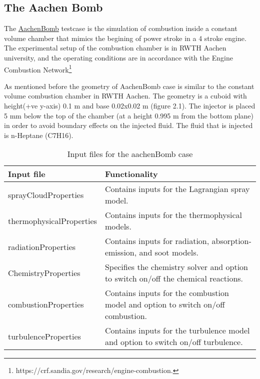 
\subsection{The Aachen Bomb}

The \href{https://develop.openfoam.com/Development/openfoam/-/tree/OpenFOAM-v2106/tutorials/lagrangian/sprayFoam/aachenBomb}{AachenBomb} testcase is the simulation of combustion inside a constant volume chamber that mimics the begining of power stroke in a 4 stroke engine. The experimental setup of the combustion chamber is in RWTH Aachen university, and the operating conditions are in accordance with the Engine Combustion Network\footnote{https://crf.sandia.gov/research/engine-combustion.}

As mentioned before the geometry of AachenBomb case is similar to the constant volume combustion chamber in RWTH Aachen. The geometry is a cuboid with height(+ve y-axis) 0.1 m and base 0.02x0.02 m (figure 2.1). The injector is placed 5 mm below the top of the chamber (at a height 0.995 m from the bottom plane) in order to avoid boundary effects on the injected fluid. The fluid
that is injected is n-Heptane (C7H16).

\begin{table}[H]
    \centering
    \caption{Input files for the aachenBomb case}
    \label{tab:aachenbomb-input-files}
    \begin{tabular}{lp{10cm}}
        \toprule
        \textbf{Input file} & \textbf{Functionality} \\
        \midrule
        sprayCloudProperties & Contains inputs for the Lagrangian spray model. \\
        thermophysicalProperties & Contains inputs for the thermophysical models. \\
        radiationProperties & Contains inputs for radiation, absorption-emission, and soot models. \\
        ChemistryProperties & Specifies the chemistry solver and option to switch on/off the chemical reactions. \\
        combustionProperties & Contains inputs for the combustion model and option to switch on/off combustion. \\
        turbulenceProperties & Contains inputs for the turbulence model and option to switch on/off turbulence. \\
        \bottomrule
    \end{tabular}
\end{table}

